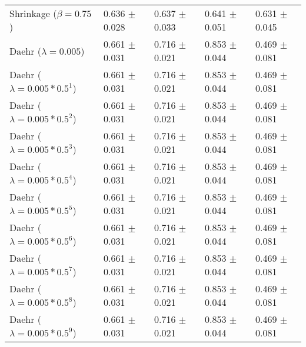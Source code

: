 \begin{table}
\begin{tabular}{*{5}{l}}
Shrinkage ($\beta=0.75$)&0.636 $\pm$ 0.028&0.637 $\pm$ 0.033&0.641 $\pm$ 0.051&0.631 $\pm$ 0.045\\
Daehr ($\lambda=0.005$)&0.661 $\pm$ 0.031&0.716 $\pm$ 0.021&0.853 $\pm$ 0.044&0.469 $\pm$ 0.081\\
Daehr ($\lambda=0.005*0.5^1$)&0.661 $\pm$ 0.031&0.716 $\pm$ 0.021&0.853 $\pm$ 0.044&0.469 $\pm$ 0.081\\
Daehr ($\lambda=0.005*0.5^2$)&0.661 $\pm$ 0.031&0.716 $\pm$ 0.021&0.853 $\pm$ 0.044&0.469 $\pm$ 0.081\\
Daehr ($\lambda=0.005*0.5^3$)&0.661 $\pm$ 0.031&0.716 $\pm$ 0.021&0.853 $\pm$ 0.044&0.469 $\pm$ 0.081\\
Daehr ($\lambda=0.005*0.5^4$)&0.661 $\pm$ 0.031&0.716 $\pm$ 0.021&0.853 $\pm$ 0.044&0.469 $\pm$ 0.081\\
Daehr ($\lambda=0.005*0.5^5$)&0.661 $\pm$ 0.031&0.716 $\pm$ 0.021&0.853 $\pm$ 0.044&0.469 $\pm$ 0.081\\
Daehr ($\lambda=0.005*0.5^6$)&0.661 $\pm$ 0.031&0.716 $\pm$ 0.021&0.853 $\pm$ 0.044&0.469 $\pm$ 0.081\\
Daehr ($\lambda=0.005*0.5^7$)&0.661 $\pm$ 0.031&0.716 $\pm$ 0.021&0.853 $\pm$ 0.044&0.469 $\pm$ 0.081\\
Daehr ($\lambda=0.005*0.5^8$)&0.661 $\pm$ 0.031&0.716 $\pm$ 0.021&0.853 $\pm$ 0.044&0.469 $\pm$ 0.081\\
Daehr ($\lambda=0.005*0.5^9$)&0.661 $\pm$ 0.031&0.716 $\pm$ 0.021&0.853 $\pm$ 0.044&0.469 $\pm$ 0.081\\
\bottomrule
\end{tabular}
\end{table}

